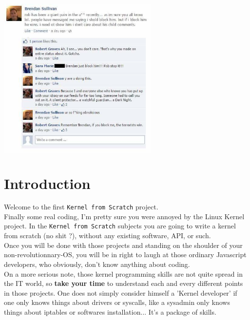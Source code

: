 \documentclass{42-en}
\begin{document}
	\includegraphics[width=8cm]{bren16.jpg}

\newpage
\chapter{Introduction}

	Welcome to the first \texttt{Kernel from Scratch} project.\\

	Finally some real coding, I'm pretty sure you were annoyed by the
    Linux Kernel project. In the \texttt{Kernel from Scratch} subjects
    you are going to write a kernel from scratch (no shit ?), without
    any existing software, API, or such.\\

	Once you will be done with those projects and standing on the
    shoulder of your non-revolutionnary-OS, you will be in right to
    laugh at those ordinary Javascript developers, who obviously,
    don't know anything about coding.\\

	On a more serious note, those kernel programming skills are not
    quite spread in the IT world, so \textbf{take your time} to
    understand each and every different points in those projects. One
    does not simply consider himself a 'Kernel developer' if one only
    knows things about drivers or syscalls, like a sysadmin only knows
    things about iptables or softwares installation...  It's a package
    of skills.\\
\end{document}
